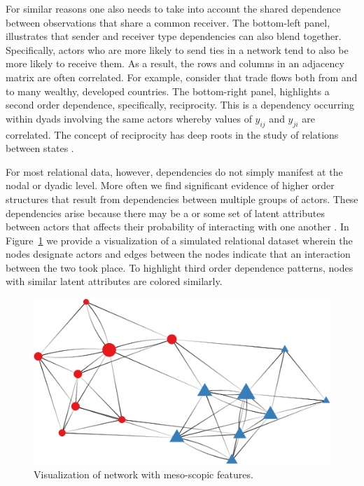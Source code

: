 For similar reasons one also needs to take into account the shared dependence between observations that share a common receiver. The bottom-left panel, illustrates that sender and receiver type dependencies can also blend together. Specifically, actors who are more likely to send ties in a network tend to also be more likely to receive them. As a result, the rows and columns in an adjacency matrix are often correlated. For example, consider that trade flows both from and to many wealthy, developed countries. The bottom-right panel, highlights a second order dependence, specifically, reciprocity. This is a dependency occurring within dyads involving the same actors whereby values of $y_{ij}$ and $y_{ji}$ are correlated. The concept of reciprocity has deep roots in the study of relations between states \citep{richardson:1960,keohane:1989}. 

For most relational data, however, dependencies do not simply manifest at the nodal or dyadic level. More often we find significant evidence of higher order structures that result from dependencies between multiple groups of actors. These dependencies arise because there may be a or some set of latent attributes between actors that affects their probability of interacting with one another \citep{zinnes:1967,wasserman:faust:1994}. In Figure~\ref{fig:thirdDeps} we provide a visualization of a simulated relational dataset wherein the nodes designate actors and edges between the nodes indicate that an interaction between the two took place. To highlight third order dependence patterns, nodes with similar latent attributes are colored similarly.

\begin{figure}[ht]
	\includegraphics[width=.6\textwidth]{stochEquiv_v2.pdf}
	\caption{Visualization of network with meso-scopic features.}
	\label{fig:thirdDeps}
\end{figure}

